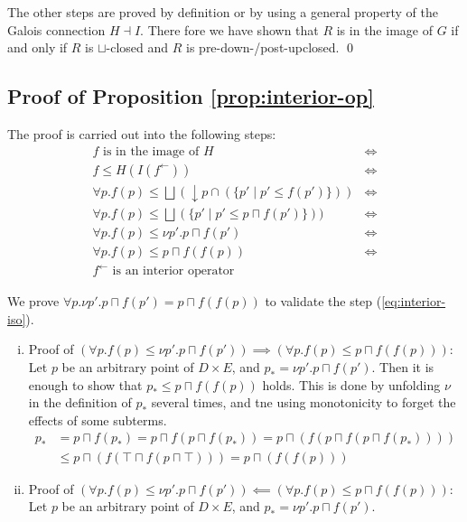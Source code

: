 \documentclass{llncs}
\newcommand{\fb}{{f^{\leftarrow}}}
\newcommand{\join}{\sqcup}
\newcommand{\bigjoin}{\bigsqcup}
\newcommand{\meet}{\sqcap}
\begin{document}
The other steps are proved by definition or by using a general property of the Galois connection $H \dashv I$.
There fore we have shown that $R$ is in the image of $G$ if and only if $R$ is $\join$-closed and $R$ is pre-down-/post-upclosed.
\qed

\subsection{Proof of Proposition \ref{prop:interior-op}}
The proof is carried out into the following steps:
\begin{align*}
 f \text{ is in the image of } H &\iff \\
 f \leq H(I(\fb)) &\iff \\
 \forall p. f(p) \leq \bigjoin (\downarrow p \cap (\{p' \mid p' \leq f(p') \})) &\iff \\
 \forall p. f(p) \leq \bigjoin (\{p' \mid p' \leq  p \meet f(p') \})) &\iff \\
 \forall p. f(p) \leq \nu p' . p \sqcap f(p') &\iff \tag{*}\label{eq:interior-iso}\\
 \forall p. f(p) \leq p \sqcap f(f(p)) &\iff \\
 \fb \text{ is an interior operator}
\end{align*}

We prove $\forall p.\nu p' . p \sqcap f(p') = p \sqcap f(f(p))$ to validate the step (\ref{eq:interior-iso}).

\begin{enumerate}[i.]
\item{Proof of $(\forall p. f(p) \leq \nu p' . p \sqcap f(p')) \implies (\forall p. f(p) \leq p \sqcap f(f(p)))$:}\\
Let $p$ be an arbitrary point of $D \times E$, and $p_{*} = \nu p' . p \sqcap f(p')$.
Then it is enough to show that $p_{*} \leq p \sqcap f(f(p))$ holds. This is done by unfolding $\nu$ in the definition of $p_{*}$ several times, and tne using monotonicity to forget the effects of some subterms.
\begin{align*}
p_{*} & = p \meet f(p_{*}) = p \meet f(p \meet f(p_{*})) = p \meet (f (p \meet f(p \meet f(p_{*})))) \\
     & \leq p \meet (f (\top \meet f(p \meet \top))) = p \meet (f (f (p)))
\end{align*}
\item{Proof of $(\forall p. f(p) \leq \nu p' . p \sqcap f(p')) \impliedby (\forall p. f(p) \leq p \sqcap f(f(p)))$:}\\
Let $p$ be an arbitrary point of $D \times E$, and $p_{*} = \nu p' . p \sqcap f(p')$.
\end{enumerate}
\end{document}
